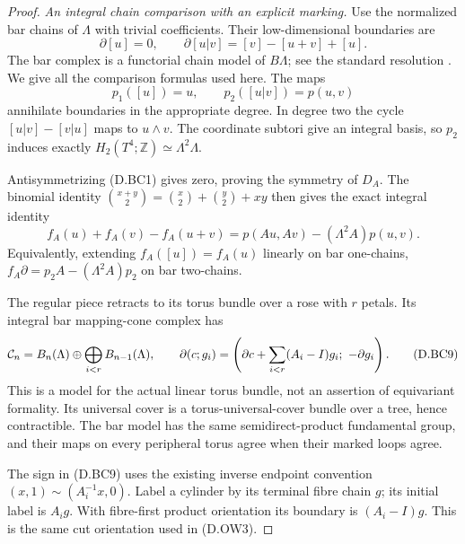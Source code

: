 \begin{proof}
\emph{An integral chain comparison with an explicit marking.}
Use the normalized bar chains of $\Lambda$ with
trivial coefficients. Their low-dimensional
boundaries are
\[
 \partial[u]=0,\qquad
 \partial[u|v]=[v]-[u+v]+[u].
                                                        \tag{D.BC6}
\]
The bar complex is a functorial chain model of
$B\Lambda$; see the standard resolution
\cite[Chapter I, Section 5]{manBrown82}.
We give all the comparison formulas used here.
The maps
\[
             p_1([u])=u,\qquad p_2([u|v])=p(u,v)
                                                        \tag{D.BC7}
\]
annihilate boundaries in the appropriate degree.
In degree two the cycle $[u|v]-[v|u]$ maps to
$u\wedge v$. The coordinate subtori give an
integral basis, so $p_2$ induces exactly
$H_2(T^4;\mathbb Z)\simeq\Lambda^2\Lambda$.

Antisymmetrizing (D.BC1) gives zero, proving
the symmetry of $D_A$. The binomial identity
$\binom{x+y}{2}=\binom{x}{2}+\binom{y}{2}+xy$
then gives the exact integral identity
\[
 f_A(u)+f_A(v)-f_A(u+v)
             =p(Au,Av)-(\Lambda^2A)p(u,v).
                                                        \tag{D.BC8}
\]
Equivalently, extending $f_A([u])=f_A(u)$
linearly on bar one-chains,
$f_A\partial=p_2A-(\Lambda^2A)p_2$ on bar
two-chains.

The regular piece retracts to its torus bundle
over a rose with $r$ petals. Its integral bar
mapping-cone complex has
\[
 {\cal C}_n=B_n(\Lambda)\oplus
                   \bigoplus_{i<r}B_{n-1}(\Lambda),
 \qquad
 \partial(c;g_i)=
 \left(\partial c+\sum_{i<r}(A_i-I)g_i;\
                                     -\partial g_i\right).
                                                        \tag{D.BC9}
\]
This is a model for the actual linear torus bundle,
not an assertion of equivariant formality. Its
universal cover is a torus-universal-cover bundle
over a tree, hence contractible. The bar model
has the same semidirect-product fundamental group,
and their maps on every peripheral torus agree
when their marked loops agree.

The sign in (D.BC9) uses the existing inverse
endpoint convention
$(x,1)\sim(A_i^{-1}x,0)$. Label a cylinder by its
terminal fibre chain $g$; its initial label is
$A_i g$. With fibre-first product orientation
its boundary is $(A_i-I)g$. This is the same cut
orientation used in (D.OW3).


\end{proof}

